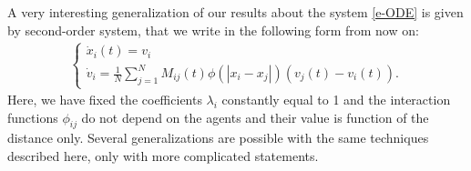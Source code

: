 \documentclass[journal]{article}
\begin{document}
 
 A very interesting generalization of our results about the system \eqref{e-ODE} is given by second-order system, that we write in the following form from now on:
 \begin{eqnarray}\label{e-ODE-2nd}
\begin{cases}
    \dot{x}_i(t) = v_i\\
\dot v_i=    \frac{1}{N}\sum_{j=1}^{N} M_{ij}(t)\phi(|x_i-x_j|) (v_j(t) - v_i(t)).
\end{cases}
\end{eqnarray}
Here, we have fixed the coefficients $\lambda_i$  constantly equal to 1 and  the interaction functions $\phi_{ij}$ do not depend on the agents and their value is function of the distance only. Several generalizations are possible with the same techniques described here, only with more complicated statements.
\end{document}
